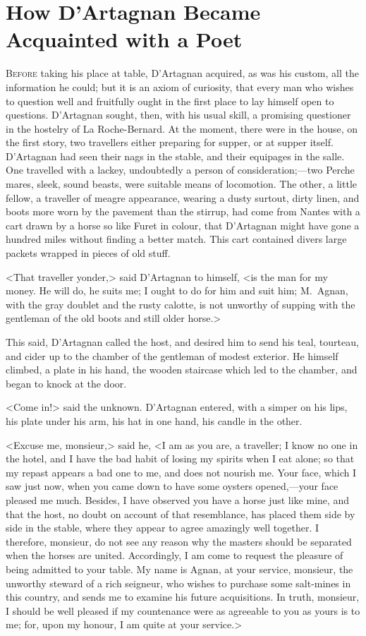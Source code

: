 \chapter{How D'Artagnan Became Acquainted with a Poet}

\lettrine{B}{efore} taking his place at table, D'Artagnan acquired, as was his custom, all the information he could; but it is an axiom of curiosity, that every man who wishes to question well and fruitfully ought in the first place to lay himself open to questions. D'Artagnan sought, then, with his usual skill, a promising questioner in the hostelry of La Roche-Bernard. At the moment, there were in the house, on the first story, two travellers either preparing for supper, or at supper itself. D'Artagnan had seen their nags in the stable, and their equipages in the salle. One travelled with a lackey, undoubtedly a person of consideration;—two Perche mares, sleek, sound beasts, were suitable means of locomotion. The other, a little fellow, a traveller of meagre appearance, wearing a dusty surtout, dirty linen, and boots more worn by the pavement than the stirrup, had come from Nantes with a cart drawn by a horse so like Furet in colour, that D'Artagnan might have gone a hundred miles without finding a better match. This cart contained divers large packets wrapped in pieces of old stuff.

<That traveller yonder,> said D'Artagnan to himself, <is the man for my money. He will do, he suits me; I ought to do for him and suit him; M.~Agnan, with the gray doublet and the rusty calotte, is not unworthy of supping with the gentleman of the old boots and still older horse.>

This said, D'Artagnan called the host, and desired him to send his teal, tourteau, and cider up to the chamber of the gentleman of modest exterior. He himself climbed, a plate in his hand, the wooden staircase which led to the chamber, and began to knock at the door.

<Come in!> said the unknown. D'Artagnan entered, with a simper on his lips, his plate under his arm, his hat in one hand, his candle in the other.

<Excuse me, monsieur,> said he, <I am as you are, a traveller; I know no one in the hotel, and I have the bad habit of losing my spirits when I eat alone; so that my repast appears a bad one to me, and does not nourish me. Your face, which I saw just now, when you came down to have some oysters opened,—your face pleased me much. Besides, I have observed you have a horse just like mine, and that the host, no doubt on account of that resemblance, has placed them side by side in the stable, where they appear to agree amazingly well together. I therefore, monsieur, do not see any reason why the masters should be separated when the horses are united. Accordingly, I am come to request the pleasure of being admitted to your table. My name is Agnan, at your service, monsieur, the unworthy steward of a rich seigneur, who wishes to purchase some salt-mines in this country, and sends me to examine his future acquisitions. In truth, monsieur, I should be well pleased if my countenance were as agreeable to you as yours is to me; for, upon my honour, I am quite at your service.>

